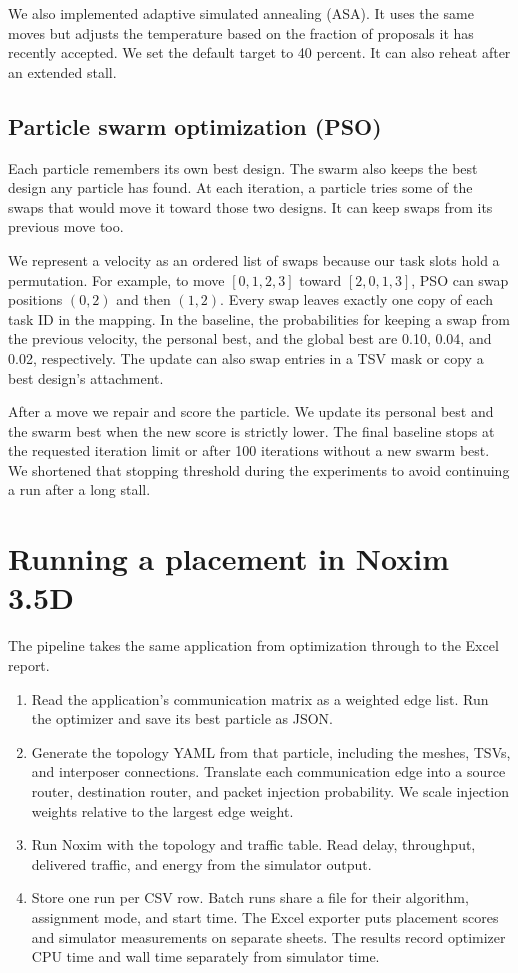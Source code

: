 \documentclass[12pt,a4paper]{article}
\begin{document}
We also implemented adaptive simulated annealing (ASA). It uses the same moves but adjusts the temperature based on the fraction of proposals it has recently accepted. We set the default target to 40 percent. It can also reheat after an extended stall.

\subsection{Particle swarm optimization (PSO)}

Each particle remembers its own best design. The swarm also keeps the best design any particle has found. At each iteration, a particle tries some of the swaps that would move it toward those two designs. It can keep swaps from its previous move too.

We represent a velocity as an ordered list of swaps because our task slots hold a permutation. For example, to move \([0,1,2,3]\) toward \([2,0,1,3]\), PSO can swap positions \((0,2)\) and then \((1,2)\). Every swap leaves exactly one copy of each task ID in the mapping. In the baseline, the probabilities for keeping a swap from the previous velocity, the personal best, and the global best are 0.10, 0.04, and 0.02, respectively. The update can also swap entries in a TSV mask or copy a best design's attachment.

After a move we repair and score the particle. We update its personal best and the swarm best when the new score is strictly lower. The final baseline stops at the requested iteration limit or after 100 iterations without a new swarm best. We shortened that stopping threshold during the experiments to avoid continuing a run after a long stall.

\clearpage
\section{Running a placement in Noxim 3.5D}

The pipeline takes the same application from optimization through to the Excel report.

\begin{enumerate}
\setlength{\itemsep}{2pt}
\item Read the application's communication matrix as a weighted edge list. Run the optimizer and save its best particle as JSON.
\item Generate the topology YAML from that particle, including the meshes, TSVs, and interposer connections. Translate each communication edge into a source router, destination router, and packet injection probability. We scale injection weights relative to the largest edge weight.
\item Run Noxim with the topology and traffic table. Read delay, throughput, delivered traffic, and energy from the simulator output.
\item Store one run per CSV row. Batch runs share a file for their algorithm, assignment mode, and start time. The Excel exporter puts placement scores and simulator measurements on separate sheets. The results record optimizer CPU time and wall time separately from simulator time.
\end{enumerate}
\end{document}
